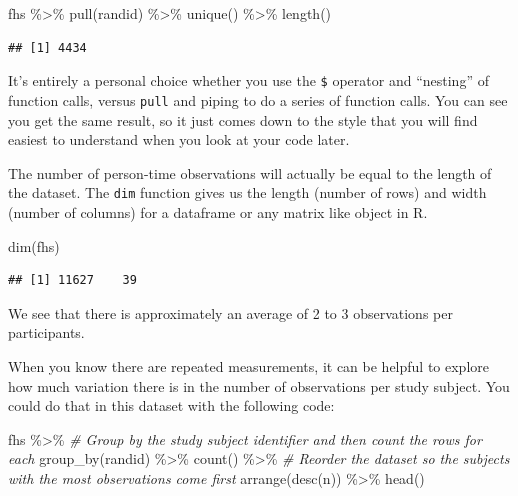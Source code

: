 \documentclass[
]{book}
\newenvironment{Shaded}{\begin{snugshade}}{\end{snugshade}}
\newcommand{\CommentTok}[1]{\textcolor[rgb]{0.56,0.35,0.01}{\textit{#1}}}
\newcommand{\FunctionTok}[1]{\textcolor[rgb]{0.00,0.00,0.00}{#1}}
\newcommand{\NormalTok}[1]{#1}
\newcommand{\SpecialCharTok}[1]{\textcolor[rgb]{0.00,0.00,0.00}{#1}}
\begin{document}
\begin{Shaded}
\begin{Highlighting}[]
\NormalTok{fhs }\SpecialCharTok{\%\textgreater{}\%} 
  \FunctionTok{pull}\NormalTok{(randid) }\SpecialCharTok{\%\textgreater{}\%} 
  \FunctionTok{unique}\NormalTok{() }\SpecialCharTok{\%\textgreater{}\%} 
  \FunctionTok{length}\NormalTok{()}
\end{Highlighting}
\end{Shaded}

\begin{verbatim}
## [1] 4434
\end{verbatim}

It's entirely a personal choice whether you use the \texttt{\$} operator and ``nesting''
of function calls, versus \texttt{pull} and piping to do a series of function calls.
You can see you get the same result, so it just comes down to the style that
you will find easiest to understand when you look at your code later.

The number of person-time observations will actually be equal to the length of the dataset.
The \texttt{dim} function gives us the length (number of rows) and width (number of columns) for a dataframe or any matrix like object in R.

\begin{Shaded}
\begin{Highlighting}[]
\FunctionTok{dim}\NormalTok{(fhs)}
\end{Highlighting}
\end{Shaded}

\begin{verbatim}
## [1] 11627    39
\end{verbatim}

We see that there is approximately an average of 2 to 3 observations per participants.

When you know there are repeated measurements, it can be helpful to explore
how much variation there is in the number of observations per study subject.
You could do that in this dataset with the following code:

\begin{Shaded}
\begin{Highlighting}[]
\NormalTok{fhs }\SpecialCharTok{\%\textgreater{}\%} 
  \CommentTok{\# Group by the study subject identifier and then count the rows for each}
  \FunctionTok{group\_by}\NormalTok{(randid) }\SpecialCharTok{\%\textgreater{}\%} 
  \FunctionTok{count}\NormalTok{() }\SpecialCharTok{\%\textgreater{}\%} 
  \CommentTok{\# Reorder the dataset so the subjects with the most observations come first}
  \FunctionTok{arrange}\NormalTok{(}\FunctionTok{desc}\NormalTok{(n)) }\SpecialCharTok{\%\textgreater{}\%} 
  \FunctionTok{head}\NormalTok{()}
\end{Highlighting}
\end{Shaded}
\end{document}
